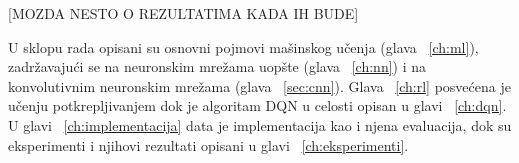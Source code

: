 [MOZDA NESTO O REZULTATIMA KADA IH BUDE]


U sklopu rada opisani su osnovni pojmovi mašinskog učenja (glava ~\ref{ch:ml}), zadržavajući se na neuronskim mrežama uopšte (glava ~\ref{ch:nn}) i na konvolutivnim neuronskim mrežama (glava ~\ref{sec:cnn}). Glava ~\ref{ch:rl} posvećena je učenju potkrepljivanjem dok je algoritam DQN u celosti opisan u glavi ~\ref{ch:dqn}. U glavi ~\ref{ch:implementacija} data je implementacija kao i njena evaluacija, dok su eksperimenti i njihovi rezultati opisani u glavi ~\ref{ch:eksperimenti}. 